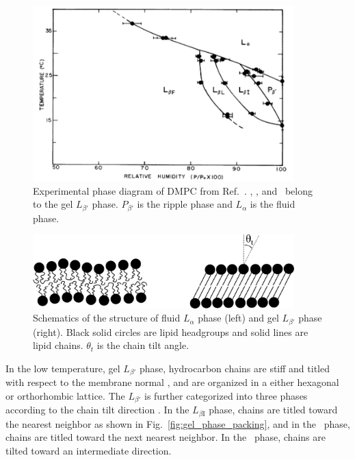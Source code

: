 \begin{figure}[htbp]
  \centering
  \includegraphics[width=0.9\textwidth]{figures/smith_phase_diagram}
  \caption{Experimental phase diagram of DMPC from Ref.~\cite{ref:Smith88}.
  \LbetaI, \LbetaL, and \LbetaF\ belong to the gel $L_{\beta'}$ phase. $P_{\beta'}$ is 
  the ripple phase and $L_\alpha$ is the fluid phase.}
  \label{fig:phase_diagram}
\end{figure}

\begin{figure}[htbp]
  \centering
  \includegraphics[width=0.9\textwidth]{figures/various_phases}
  \caption[]{Schematics of the structure of fluid $L_\alpha$ phase (left) and 
  gel $L_{\beta'}$ phase (right). Black solid circles are lipid headgroups 
  and solid lines are lipid chains. $\theta_t$ is the chain tilt angle.}
  \label{fig:various_phases}
\end{figure}

In the low temperature, gel $L_{\beta'}$
phase, hydrocarbon chains are stiff and titled with respect to the membrane
normal \cite{ref:Tardieu73}, and are organized in a either hexagonal 
or orthorhombic lattice. 
The $L_{\beta'}$ is further categorized into three phases according to the 
chain tilt direction \cite{ref:Smith88,ref:Tristram93,Tristram-Nagle02}. 
In the $L_{\beta\text{I}}$ phase, chains are titled toward the 
nearest neighbor as shown in Fig.~\ref{fig:gel_phase_packing}, and
in the \LbetaF\ phase, chains are titled toward the next nearest neighbor.
In the \LbetaL\ phase, chains are tilted toward an intermediate direction.

